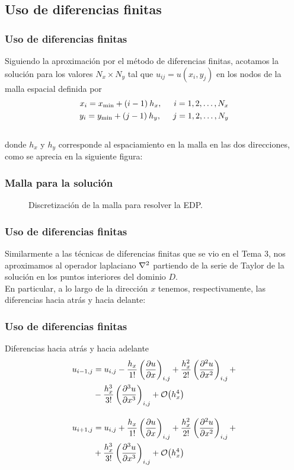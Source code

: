 \subsection{Uso de diferencias finitas}
\begin{frame}
\frametitle{Uso de diferencias finitas}
Siguiendo la aproximación por el método de diferencias finitas, acotamos la solución para los valores $N_{x} \times N_{y}$ tal que $u_{ij} = u(x_{i}, y_{j})$ en los nodos de la malla espacial definida por
\begin{align*}
x_{i} = x_{\text{min}} + (i - 1) \: h_{x}, \hspace{0.5cm} i = 1, 2, \ldots, N_{x} \\
y_{i} = y_{\text{min}} + (j - 1) \: h_{y}, \hspace{0.5cm} j = 1, 2, \ldots, N_{y}
\end{align*}
\\
\bigskip
\pause
donde $h_{x}$ y $h_{y}$ corresponde al espaciamiento en la malla en las dos direcciones, como se aprecia en la siguiente figura:
\end{frame}
{
\begin{frame}
\frametitle{Malla para la solución}
\captionsetup{font=small,labelfont=small}
\begin{figure}
	\centering
	
	\caption{Discretización de la malla para resolver la EDP.}
	\label{fig:figura_01}
\end{figure}
\end{frame}
}
\begin{frame}
\frametitle{Uso de diferencias finitas}
Similarmente a las técnicas de diferencias finitas que se vio en el Tema 3, nos aproximamos al operador laplaciano $\laplacian$ partiendo de la serie de Taylor de la solución en los puntos interiores del dominio $D$.
\\
\bigskip
En particular, a lo largo de la dirección $x$ tenemos, respectivamente, las diferencias hacia atrás y hacia delante:
\end{frame}
\begin{frame}
\frametitle{Uso de diferencias finitas}
Diferencias hacia atrás y hacia adelante
\fontsize{12}{12}\selectfont
\begin{align*}
u_{i-1, j} &= u_{i, j} - \dfrac{h_{x}}{1!} \left( \pdv{u}{x} \right)_{i, j} + \dfrac{h_{x}^{2}}{2!} \left( \pdv[2]{u}{x} \right)_{i, j} + \\
&- \dfrac{h_{x}^{3}}{3!} \left( \pdv[3]{u}{x} \right)_{i, j} + \order{h_{x}^{4}}  \\[1em]
u_{i+1, j} &= u_{i, j} + \dfrac{h_{x}}{1!} \left( \pdv{u}{x} \right)_{i, j} + \dfrac{h_{x}^{2}}{2!} \left( \pdv[2]{u}{x} \right)_{i, j} +\\
&+ \dfrac{h_{x}^{3}}{3!} \left( \pdv[3]{u}{x} \right)_{i, j} + \order{h_{x}^{4}}
\end{align*}
\end{frame}
